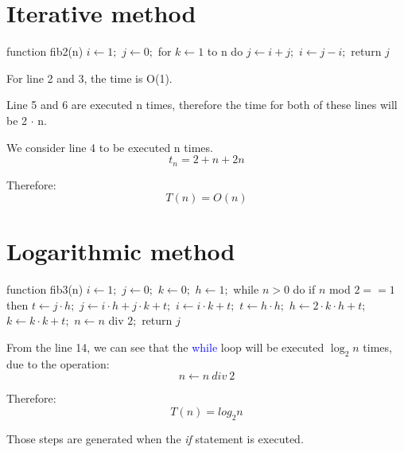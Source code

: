 \documentclass{article}
\begin{document}

	\newpage
	\section{Iterative method}
		\begin{algorithm}[caption={Iterative method}, label={Fibonacci2}]
function fib2(n)
	$i \leftarrow 1;$
	$j \leftarrow 0;$
	for $k \leftarrow 1$ to n do
		$j \leftarrow i + j;$
		$i \leftarrow j - i;$
	return $j$
		\end{algorithm}

		\par For line 2 and 3, the time is O(1).
		\par Line 5 and 6 are executed n times, therefore the time for both of these lines will be 2 $\cdot$ n.
		\par We consider line 4 to be executed n times.
		\newline
		\[
			t_n = 2 + n + 2n
		\]
		\par Therefore:
		\[
			T(n) = O(n)
		\]


	\newpage
	\section{Logarithmic method}
		\begin{algorithm}[caption={Logarithmic method}, label={Fibonacci3}]
function fib3(n)
	$i \leftarrow 1;$
	$j \leftarrow 0;$
	$k \leftarrow 0;$
	$h \leftarrow 1;$
	while $n > 0$ do
		if $n$ mod $2 == 1$ then
			$t \leftarrow j \cdot h;$
			$j \leftarrow i \cdot h + j \cdot k + t;$
			$i \leftarrow i \cdot k + t;$
		$t \leftarrow h \cdot h;$
		$h \leftarrow 2 \cdot k \cdot h + t;$
		$k \leftarrow k \cdot k + t;$
		$n \leftarrow n$ div $2;$
	return $j$
		\end{algorithm}

		\par From the line 14, we can see that the \textcolor{blue}{while} loop will be executed $\log_2 n$ times, due to the operation:
		\[
			n \leftarrow n \ div \ 2
		\]
		\par Therefore:
		\[
			T(n) = log_2 n
		\]


		\begin{center}
			Those steps are generated when the \textit{if} statement is executed.
		\end{center}
\end{document}
